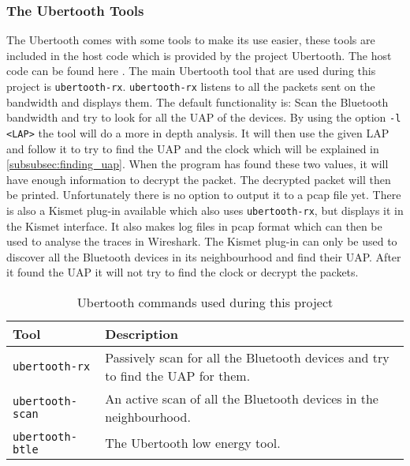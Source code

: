 \subsubsection{The Ubertooth Tools}
\label{subsubsec:ubertooth_tools}
The Ubertooth comes with some tools to make its use easier, these tools are included in the host code which is provided by the project Ubertooth. The host code can be found here \cite{hostcode}.
The main Ubertooth tool that are used during this project is \verb|ubertooth-rx|. \verb|ubertooth-rx| listens to all the packets sent on the bandwidth and displays them. The default functionality is: Scan the Bluetooth bandwidth and try to look for all the UAP of the devices. By using the option \verb|-l <LAP>| the tool will do a more in depth analysis. It will then use the given LAP and follow it to try to find the UAP and the clock which will be explained in \ref{subsubsec:finding_uap}. When the program has found these two values, it will have enough information to decrypt the packet. The decrypted packet will then be printed. Unfortunately there is no option to output it to a pcap file yet. \pend There is also a Kismet plug-in available which also uses \verb|ubertooth-rx|, but displays it in the Kismet interface. It also makes log files in pcap format which can then be used to analyse the traces in Wireshark. The Kismet plug-in can only be used to discover all the Bluetooth devices in its neighbourhood and find their UAP. After it found the UAP it will not try to find the clock or decrypt the packets.

\begin{table}[!h]
\begin{tabular}{|l|p{10cm}|}
\hline
Tool & Description \\
\hline
\verb|ubertooth-rx| & Passively scan for all the Bluetooth devices and try to find the UAP for them. \\
\hline
\verb|ubertooth-scan| & An active scan of all the Bluetooth devices in the neighbourhood.  \\
\hline
\verb|ubertooth-btle| & The Ubertooth low energy tool. \\
\hline
\end{tabular}
\caption{Ubertooth commands used during this project}
\label{tab:ubertooth_tools}
\end{table}
